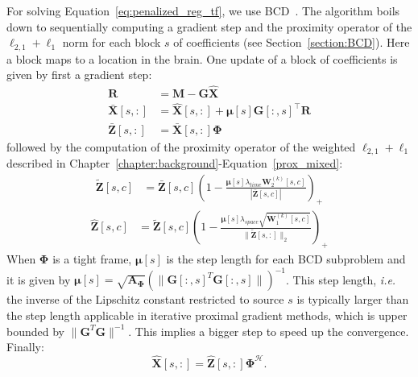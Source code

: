 For solving Equation~\eqref{eq:penalized_reg_tf}, we use BCD~\cite{tseng2010approximation}. The algorithm boils down to sequentially computing a gradient step and the proximity operator of the $\ell_{2,1}+\ell_1$ norm for each block $s$ of coefficients (see Section~\ref{section:BCD}). Here a block maps to a location in the brain. One update of a block of coefficients is given by first a gradient step:
\begin{align} \label{eq:block_update}
    \mathbf{R} &= \mathbf{M} - \mathbf{G}\hat{\mathbf{X}} \\
    \bar{\mathbf{X}}[s,:] &= \hat{\mathbf{X}}[s,:] + \mathbf{\mu}[s]\mathbf{G}[:,s]^\top\mathbf{R} \\
    \bar{\mathbf{Z}}[s,:] &= \bar{\mathbf{X}}[s,:]\mathbf{\Phi}
\end{align}
followed by the computation of the proximity operator of the weighted $\ell_{2,1}+\ell_1$ described in Chapter~\ref{chapter:background}-Equation~\ref{prox_mixed}:
\begin{equation} \label{prox_l1}
\begin{aligned}
    \tilde{\mathbf{Z}}[s,c] &= \bar{\mathbf{Z}}[s,c]\left(1 - \frac{\mathbf{\mu}[s]\lambda_{time}\mathbf{W}_2^{(k)}[s,c]}{|\bar{\mathbf{Z}}[s,c]|} \right)_+
\end{aligned}
\end{equation}
\begin{equation} \label{prox_l21}
\begin{aligned}
    \hat{\mathbf{Z}}[s,c] &= \tilde{\mathbf{Z}}[s,c]\left(1 - \frac{\mathbf{\mu}[s]\lambda_{space}\sqrt{\mathbf{W}_1^{(k)}[s,c]}}{\|\tilde{\mathbf{Z}}[s,:]\|_2}\right)_+
\end{aligned}
\end{equation}
When $\mathbf{\Phi}$ is a tight frame, $\mathbf{\mu}[s]$ is the step length for each BCD subproblem and it is given by $\mathbf{\mu}[s]=\sqrt{\mathbf{A}_{\mathbf{\Phi}}}(\|\mathbf{G}[:,s]^T\mathbf{G}[:,s]\|)^{-1}$. This step length, \textit{i.e.} the inverse of the Lipschitz constant restricted to source $s$ is typically larger than the step length applicable in iterative proximal gradient methods, which is upper bounded by $\|\mathbf{G}^T\mathbf{G}\|^{-1}$. This implies a bigger step to speed up the convergence.
Finally:
\begin{equation}
    \hat{\mathbf{X}}[s,:] = \hat{\mathbf{Z}}[s,:]\mathbf{\Phi}^\mathcal{H}.
\end{equation}

